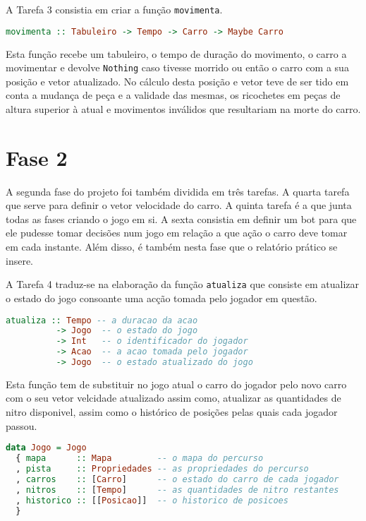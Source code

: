 A Tarefa 3 consistia em criar a função \texttt{movimenta}.

\begin{lstlisting}[language=Haskell]
 movimenta :: Tabuleiro -> Tempo -> Carro -> Maybe Carro
\end{lstlisting}

Esta função recebe um tabuleiro, o tempo de duração do movimento, o carro a
movimentar e devolve \texttt{Nothing} caso tivesse morrido ou então o carro com
a sua posição e vetor atualizado. No cálculo desta posição e vetor teve de ser
tido em conta a mudança de peça e a validade das mesmas, os ricochetes em peças
de altura superior à atual e movimentos inválidos que resultariam na morte do
carro.


\section{Fase 2}
\label{sec:analisefase2}

A segunda fase do projeto foi também dividida em três tarefas. A quarta tarefa
que serve para definir o vetor velocidade do carro. A quinta tarefa é a que
junta todas as fases criando o jogo em si. A sexta consistia em definir um bot
para que ele pudesse tomar decisões num jogo em relação a que ação o carro deve
tomar em cada instante. Além disso, é também nesta fase que o relatório prático
se insere.

A Tarefa 4 traduz-se na elaboração da função \texttt{atualiza} que consiste em
atualizar o estado do jogo consoante uma acção tomada pelo jogador em questão.

\begin{lstlisting}[language=Haskell]
 atualiza :: Tempo -- a duracao da acao
          -> Jogo  -- o estado do jogo
          -> Int   -- o identificador do jogador
          -> Acao  -- a acao tomada pelo jogador
          -> Jogo  -- o estado atualizado do jogo
\end{lstlisting}

Esta função tem de substituir no jogo atual o carro do jogador pelo novo carro
com o seu vetor velcidade atualizado assim como, atualizar as quantidades de
nitro disponivel, assim como o histórico de posições pelas quais cada jogador
passou.

\begin{lstlisting}[language=Haskell]
 data Jogo = Jogo
  { mapa      :: Mapa         -- o mapa do percurso
  , pista     :: Propriedades -- as propriedades do percurso
  , carros    :: [Carro]      -- o estado do carro de cada jogador
  , nitros    :: [Tempo]      -- as quantidades de nitro restantes
  , historico :: [[Posicao]]  -- o historico de posicoes
  }
\end{lstlisting}

